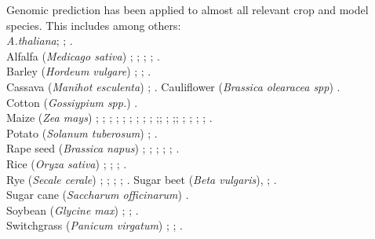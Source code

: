 Genomic prediction has been applied to almost all relevant crop and model species. This
includes among others: \\
\textit{A.thaliana}; \cite{shen2013novel}; \cite{hu2015}.\\
Alfalfa (\textit{Medicago sativa}) \cite{li2012applied}; \cite{annicchiarico2015accuracy}; \cite{li2015genomical}; \cite{biazzi2017genome}; \cite{hawkins2018recent}. \\
Barley (\textit{Hordeum vulgare}) \cite{zhong2009factors}; \cite{oakey2016}; \cite{neyhart2019}. \\
Cassava (\textit{Manihot esculenta}) \cite{elias2018}; \cite{elias2018improving}.
Cauliflower (\textit{Brassica olearacea spp}) \cite{thorwarth2018genomic}.\\
Cotton (\textit{Gossiypium spp.}) \cite{gapare2018}.\\
Maize (\textit{Zea mays}) \cite{rincent2012}; \cite{windhausen2012};
\cite{technow2013genomic}; \cite{riedelsheimer2013genomic}; \cite{guo2013accuracy};
\cite{peiffer2014genetic}; \cite{technow2014genome}; \cite{lehermeier2014usefulness};
\cite{owens2014foundation}; \cite{montesinos2015threshold};\cite{bustos2016improvement};
\cite{kadam2016genomic}; \cite{schopp2017accuracy};\cite{schopp2017genomic};
\cite{e2017genomic}; \cite{brauner2018genomic};
\cite{schrag2018beyond}; \cite{moeinizade2019}; \cite{allier2019usefulness}. \\
Potato (\textit{Solanum tuberosum}) \cite{enciso2018genomic}; \cite{Endelman2018pot}.\\
Rape seed (\textit{Brassica napus}) \cite{snowdon2012potential}; \cite{wurschum2014potential}; \cite{qian2014sub}; \cite{jan2016genomic}; \cite{luo2017genomic}; \cite{werner2018effective}.\\
Rice (\textit{Oryza sativa})  \cite{Xu2013rice}; \cite{Grenier2015}; \cite{BenHassen2018}; \cite{Momen2019}. \\
Rye (\textit{Secale cerale}) \cite{bernal2014importance}; \cite{wang2014accuracy};
\cite{auinger2016model}; \cite{marulanda2016optimum}; \cite{bernal2017genomic}.
Sugar beet (\textit{Beta vulgaris}), \cite{wurschum2013genomic}; \cite{biscarini2014genome}.\\
Sugar cane (\textit{Saccharum officinarum}) \cite{gouy2013experimental}.\\
Soybean (\textit{Glycine max}) \cite{Jarquin_2016}; \cite{Xavier_2016}; \cite{Stewart_Brown_2019}.\\
Switchgrass (\textit{Panicum virgatum}) \cite{Ramstein_2016}; \cite{Poudel_2019}; \cite{Ramstein_2019}. \\

